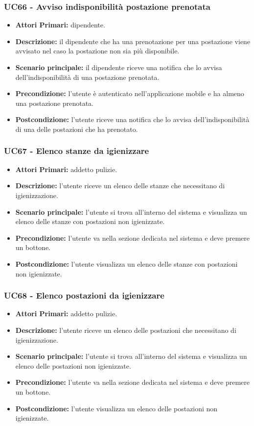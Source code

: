 \subsubsection{ UC66 - Avviso indisponibilità postazione prenotata }
\begin{itemize}
	\item\textbf{Attori Primari:} dipendente.
	\item\textbf{Descrizione:} il dipendente che ha una prenotazione per una postazione viene avvisato nel caso la postazione non sia più disponibile.
	\item\textbf{Scenario principale:} il dipendente riceve una notifica che lo avvisa dell'indisponibilità di una postazione prenotata.
	\item\textbf{Precondizione:} l’utente è autenticato nell'applicazione mobile e ha almeno una postazione prenotata.
	\item\textbf{Postcondizione:} l'utente riceve una notifica che lo avvisa dell'indisponibilità di una delle postazioni che ha prenotato.
\end{itemize}

\subsubsection{UC67 - Elenco stanze da igienizzare}
\begin{itemize}
           	\item\textbf{Attori Primari:} addetto pulizie.
           	\item\textbf{Descrizione:} l'utente riceve un elenco delle stanze che necessitano di igienizzazione.
           	\item\textbf{Scenario principale:} l'utente si trova all'interno del sistema e visualizza un elenco delle stanze con postazioni non igienizzate.
           	\item\textbf{Precondizione:} l'utente va nella sezione dedicata nel sistema e deve premere un bottone.
           	\item\textbf{Postcondizione:} l'utente visualizza un elenco delle stanze con postazioni non igienizzate.
\end{itemize}
\subsubsection{UC68 - Elenco postazioni da igienizzare}
\begin{itemize}
           	\item\textbf{Attori Primari:} addetto pulizie.
           	\item\textbf{Descrizione:} l'utente riceve un elenco delle postazioni che necessitano di igienizzazione.
           	\item\textbf{Scenario principale:} l'utente si trova all'interno del sistema e visualizza  un elenco delle postazioni non igienizzate.
           	\item\textbf{Precondizione:} l'utente va nella sezione dedicata nel sistema e deve premere un bottone.
           	\item\textbf{Postcondizione:} l'utente visualizza un elenco delle postazioni non igienizzate.
\end{itemize}

